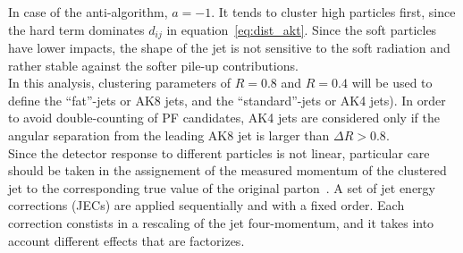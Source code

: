 In case of the anti-\kt algorithm, $a = -1$. It tends to cluster high \pt particles first, since the hard term dominates $d_{ij}$ in equation~\ref{eq:dist_akt}. Since the soft particles have lower impacts, the shape of the jet is not sensitive to the soft radiation and rather stable against the softer pile-up contributions.\\
In this analysis, clustering parameters of $R = 0.8$ and $R = 0.4$ will be used to define the ``fat''-jets or AK8 jets, and the ``standard''-jets or AK4 jets). In order to avoid double-counting of PF candidates, AK4 jets are considered only if the angular separation from the leading AK8 jet is larger than $\Delta R>0.8$.\\
Since the detector response to different particles is not linear, particular care should be taken in the assignement of the measured momentum of the clustered jet to the corresponding true value of the original parton~\cite{bib:1748-0221-6-11-P11002}. A set of jet energy corrections (JECs) are applied sequentially and with a fixed order. Each correction constists in a rescaling of the jet four-momentum, and it takes into account different effects that are factorizes.

